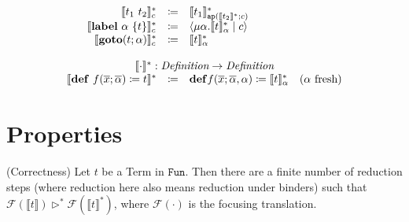 \documentclass[nonacm]{acmart}
\newcommand{\translate}[1]{\ensuremath{\llbracket#1 \rrbracket}}
\newcommand{\cut}[2]{\ensuremath{\langle #1 \mid #2 \rangle}}
\newcommand{\translatestar}[2]{\ensuremath{\llbracket #1 \rrbracket_{#2}^*}}
\newcommand{\reducesto}{\ensuremath{\triangleright}}
\newcommand{\focus}[1]{\ensuremath{\mathcal{F}(#1)}}
\newcommand{\fresh}[1]{\ensuremath{(#1\text{ fresh})}}
\begin{document}
\[\begin{array}{rcll}
    \translatestar{t_1\ t_2}{c} & \coloneq & \translatestar{t_1}{\mathtt{ap}(\translate{t_2}^*;c)} & \\
    \translatestar{\mathbf{label}\ \alpha\ \{t\}}{c} & \coloneq & \cut{\mu \alpha.\translatestar{t}{\alpha}}{c} & \\
    \translatestar{\mathbf{goto}(t;\alpha)}{c} & \coloneq & \translatestar{t}{\alpha} & \\
    \\
    \multicolumn{4}{c}{\translate{\cdot}^* : \emph{Definition} \rightarrow \emph{Definition}}\\
    \translate{\mathbf{def}\ f(\overline{x};\overline{\alpha}) \coloneq t}^* & \coloneq & \mathbf{def}f(\overline{x};\overline{\alpha},\alpha) \coloneq \translatestar{t}{\alpha} & \fresh{\alpha}
  \end{array}
\]

\section{Properties}
\label{sec:Properties}

\begin{theorem} (Correctness)
  Let $t$ be a Term in $\mathtt{Fun}$. Then there are a finite number of reduction steps (where reduction here also means reduction under binders) such that $\focus{\translate{t}} \reducesto^{\ast} \focus{\translate{t}^*}$, where $\focus{\cdot}$ is the focusing translation.
\end{theorem}
\end{document}
